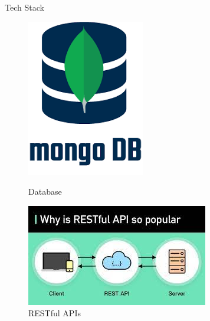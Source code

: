 \documentclass{beamer}
\begin{document}
\begin{frame}{Tech Stack}
\begin{figure}
\begin{minipage}[t]{0.2\textwidth}
            \includegraphics[width=\textwidth]{mongoDB.png}
            \caption{Database}
        \end{minipage}\hfill
        \begin{minipage}[t]{0.2\textwidth}
            \centering
            \includegraphics[width=\textwidth]{API.jpeg}
            \caption{RESTful APIs}
        \end{minipage}\hfill
    \end{figure}
	\end{frame}
\end{document}
